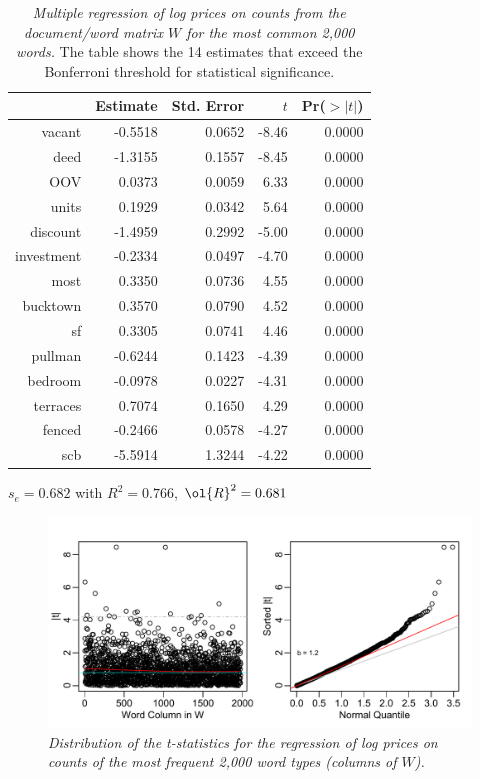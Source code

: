 \documentclass[12pt]{article}
\begin{document}
 \begin{table}
 \caption{ \label{tab:regrInd} {\sl Multiple regression of log prices on 
  counts from the document/word matrix $W$ for the most common 2,000 words.}  The table shows the 14 estimates that exceed the Bonferroni threshold for statistical significance.} 

\begin{center}
\begin{tabular}{rrrrr}
  \hline
 & Estimate & Std. Error & $t$ & Pr($>|t|$) \\ 
  \hline
  vacant & -0.5518 & 0.0652 & -8.46 & 0.0000 \\ 
  deed & -1.3155 & 0.1557 & -8.45 & 0.0000 \\ 
  OOV & 0.0373 & 0.0059 & 6.33 & 0.0000 \\ 
  units & 0.1929 & 0.0342 & 5.64 & 0.0000 \\ 
  discount & -1.4959 & 0.2992 & -5.00 & 0.0000 \\ 
  investment & -0.2334 & 0.0497 & -4.70 & 0.0000 \\ 
  most & 0.3350 & 0.0736 & 4.55 & 0.0000 \\ 
  bucktown & 0.3570 & 0.0790 & 4.52 & 0.0000 \\ 
  sf & 0.3305 & 0.0741 & 4.46 & 0.0000 \\ 
  pullman & -0.6244 & 0.1423 & -4.39 & 0.0000 \\ 
  bedroom & -0.0978 & 0.0227 & -4.31 & 0.0000 \\ 
  terraces & 0.7074 & 0.1650 & 4.29 & 0.0000 \\ 
  fenced & -0.2466 & 0.0578 & -4.27 & 0.0000 \\ 
  scb & -5.5914 & 1.3244 & -4.22 & 0.0000 \\ 
 \hline
\end{tabular}
 
    $s_e =  0.682$ with $R^2 =  0.766$, $\ol{R}^2 =  0.681$  
\end{center}
\end{table}



 \begin{figure}
  \caption{ \label{fig:regrInd} { \sl Distribution of the t-statistics for the regression of log prices on counts of the most frequent 2,000 word types (columns of $W$).}}
 \centerline{  \includegraphics[width=6in]{figures/tstatRegrInd}    }
 \vspace{0.2in}
 \end{figure}
\end{document}
